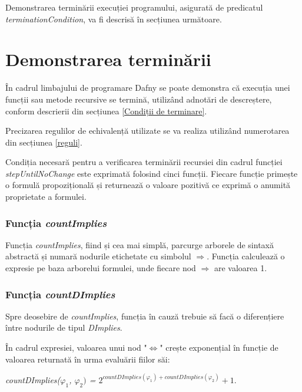 Demonstrarea terminării execuției programului, asigurată de predicatul \textit{terminationCondition}, va fi descrisă în secțiunea următoare.



\section{Demonstrarea terminării}


În cadrul limbajului de programare Dafny se poate demonstra că execuția unei funcții sau metode recursive se termină, utilizând adnotări de descreștere, conform descrierii din secțiunea \ref{Condiții de terminare}.

\begin{remark}
Precizarea regulilor de echivalență utilizate se va realiza utilizând numerotarea din secțiunea \ref{reguli}.
\end{remark} 

Condiția necesară pentru a verificarea terminării recursiei din cadrul funcției \textit{stepUntilNoChange} este exprimată folosind cinci funcții. Fiecare funcție primește o formulă propozițională și returnează o valoare pozitivă ce exprimă o anumită proprietate a formulei.   

\subsubsection{Funcția \textit{countImplies}}

Funcția \textit{countImplies}, fiind și cea mai simplă, parcurge arborele de sintaxă abstractă și numară nodurile etichetate cu simbolul $\Rightarrow$. Funcția calculează o expresie pe baza arborelui formulei, unde fiecare nod $\Rightarrow$ are valoarea 1. 

\subsubsection{Funcția \textit{countDImplies}}

Spre deosebire de \textit{countImplies}, funcția în cauză trebuie să facă o diferențiere între nodurile de tipul \textit{DImplies}. 

În cadrul expresiei, valoarea unui nod "$\Leftrightarrow$" crește exponențial în funcție de valoarea returnată în urma evaluării fiilor săi:
\begin{center}
\textit{countDImplies($\varphi_1$, $\varphi_2)$ = $2^{countDImplies(\varphi_1) + countDImplies(\varphi_2)} + 1$}.
\end{center}
